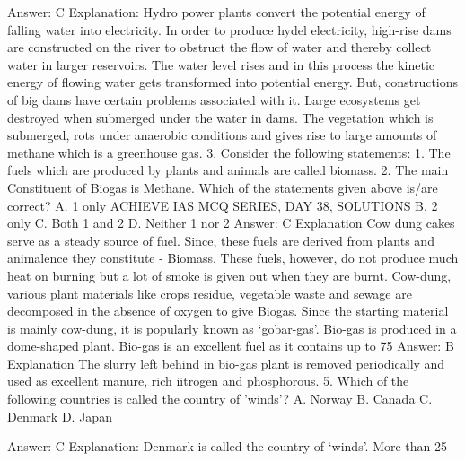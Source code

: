 Answer: C
Explanation: Hydro power plants convert the potential energy of falling water into electricity. In order to produce hydel electricity, high-rise dams are constructed on the river to obstruct the flow of water and thereby collect water in larger reservoirs. The water level rises and in this process the kinetic energy of flowing water gets transformed into potential energy. But, constructions of big dams have certain problems associated with it. Large ecosystems get destroyed when submerged under the water in dams. The vegetation which is submerged, rots under anaerobic conditions and gives rise to large amounts of methane which is a greenhouse gas. 3. Consider the following statements: 1. The fuels which are produced by plants and animals are called biomass. 2. The main Constituent of Biogas is Methane. Which of the statements given above is/are correct? A. 1 only ACHIEVE IAS MCQ SERIES, DAY 38, SOLUTIONS B. 2 only C. Both 1 and 2 D. Neither 1 nor 2 
Answer: C Explanation Cow dung cakes serve as a steady source of fuel. Since, these fuels are derived from plants 
and animalence they constitute - Biomass. These fuels, however, do not produce much heat on burning but a lot of smoke is given out when they are burnt. Cow-dung, various plant materials like crops residue, vegetable waste and sewage are decomposed in the absence of oxygen to give Biogas. Since the starting material is mainly cow-dung, it is popularly known as ‘gobar-gas’. Bio-gas is produced in a dome-shaped plant. Bio-gas is an excellent fuel as it contains up to 75%
Answer: B Explanation The slurry left behind in bio-gas plant is removed periodically and used as excellent manure, 
rich iitrogen and phosphorous. 5. Which of the following countries is called the country of 'winds'? A. Norway B. Canada C. Denmark D. Japan 

Answer: C
Explanation: Denmark is called the country of ‘winds’. More than 25%

